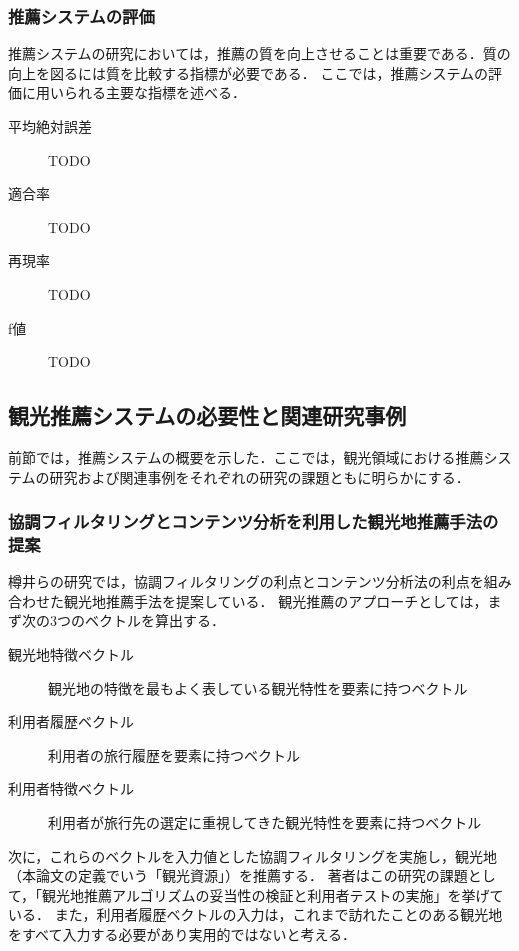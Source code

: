 \documentclass{jsarticle}
\begin{document}
\subsubsection{推薦システムの評価}

推薦システムの研究においては，推薦の質を向上させることは重要である．質の向上を図るには質を比較する指標が必要である．
ここでは，推薦システムの評価に用いられる主要な指標を述べる．

\begin{description}
\item[平均絶対誤差] TODO
\item[適合率] TODO
\item[再現率] TODO
\item[f値] TODO
\end{description}

\subsection{観光推薦システムの必要性と関連研究事例}

前節では，推薦システムの概要を示した．ここでは，観光領域における推薦システムの研究および関連事例をそれぞれの研究の課題ともに明らかにする．

\subsubsection{協調フィルタリングとコンテンツ分析を利用した観光地推薦手法の提案}

樽井らの研究\cite{tarui}では，協調フィルタリングの利点とコンテンツ分析法の利点を組み合わせた観光地推薦手法を提案している．
観光推薦のアプローチとしては，まず次の3つのベクトルを算出する．

\begin{description}
\item[観光地特徴ベクトル] 観光地の特徴を最もよく表している観光特性を要素に持つベクトル
\item[利用者履歴ベクトル] 利用者の旅行履歴を要素に持つベクトル
\item[利用者特徴ベクトル] 利用者が旅行先の選定に重視してきた観光特性を要素に持つベクトル
\end{description}

次に，これらのベクトルを入力値とした協調フィルタリングを実施し，観光地（本論文の定義でいう「観光資源」）を推薦する．
著者はこの研究の課題として，「観光地推薦アルゴリズムの妥当性の検証と利用者テストの実施」を挙げている．
また，利用者履歴ベクトルの入力は，これまで訪れたことのある観光地をすべて入力する必要があり実用的ではないと考える．
\end{document}
